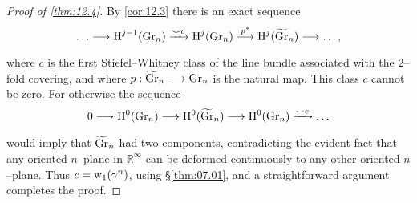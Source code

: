 \documentclass[../main]{subfiles}
\begin{document}
\begin{proof}[Proof of \ref{thm:12.4}]
By \ref{cor:12.3} there is an exact sequence \[\ldots \varrightarrow{} \homology^{j - 1}(\grassmannian_n) \varrightarrow{\smile c} \homology^j(\grassmannian_n) \varrightarrow{p^\ast} \homology^j({\xtilde \grassmannian}_n) \longrightarrow \ldots,\] where $c$ is the first Stiefel--Whitney class of the line bundle associated with the $2$--fold covering, and where $p : {\xtilde \grassmannian}_n \longrightarrow \grassmannian_n$ is the natural map. This class $c$ cannot be zero. For otherwise the sequence \[0 \varrightarrow{} \homology^0(\grassmannian_n) \varrightarrow{} \homology^0({\xtilde \grassmannian}_n) \varrightarrow{} \homology^0(\grassmannian_n) \varrightarrow{\smile c} \ldots\] would imply that ${\xtilde \grassmannian}_n$ had two components, contradicting the evident fact that any oriented $n$--plane in ${\mathbb R}^\infty$ can be deformed continuously to any other oriented $n$--plane. Thus $c = \operatorname{w}_1(\gamma^n)$, using \S\ref{thm:07.01}, and a straightforward argument completes the proof. 
\end{proof}
\end{document}

